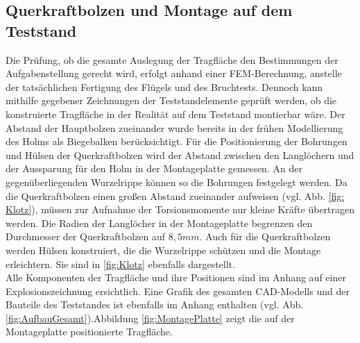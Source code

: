 \subsection{Querkraftbolzen und Montage auf dem Teststand}
Die Prüfung, ob die gesamte Auslegung der Tragfläche den Bestimmungen der Aufgabenstellung gerecht wird, erfolgt anhand einer FEM-Berechnung, anstelle der tatsächlichen Fertigung des Flügels und des Bruchtests. Dennoch kann mithilfe gegebener Zeichnungen der Teststandelemente geprüft werden, ob die konstruierte Tragfläche in der Realität auf dem Teststand montierbar wäre. Der Abstand der Hauptbolzen zueinander wurde bereits in der frühen Modellierung des Holms als Biegebalken berücksichtigt. Für die Positionierung der Bohrungen und Hülsen der Querkraftbolzen wird der Abstand zwischen den Langlöchern und der Aussparung für den Holm in der Montageplatte gemessen. An der gegenüberliegenden Wurzelrippe können so die Bohrungen festgelegt werden. Da die Querkraftbolzen einen großen Abstand zueinander aufweisen (vgl. Abb. \ref{fig: Klotz}), müssen zur Aufnahme der Torsionsmomente nur kleine Kräfte übertragen werden. Die Radien der Langlöcher in der Montageplatte begrenzen den Durchmesser der Querkraftbolzen auf $ 8,5mm $. Auch für die Querkraftbolzen werden Hülsen konstruiert, die die Wurzelrippe schützen und die Montage erleichtern. Sie sind in \ref{fig:Klotz} ebenfalls dargestellt.\\

\noindent Alle Komponenten der Tragfläche und ihre Positionen sind im Anhang auf einer Explosionszeichnung ersichtlich. Eine Grafik des gesamten CAD-Modells und der Bauteile des Teststandes ist ebenfalls im Anhang enthalten (vgl. Abb. \ref{fig:AufbauGesamt}).Abbildung \ref{fig:MontagePlatte} zeigt die auf der Montageplatte positionierte Tragfläche.
